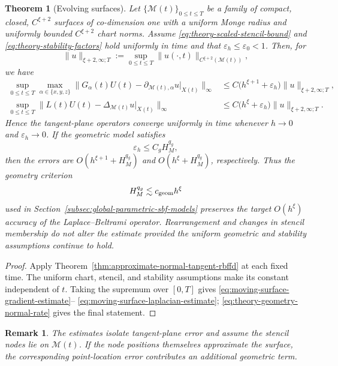 \documentclass[a4paper,fleqn]{cas-sc}
\newtheorem{theorem}{Theorem}
\newtheorem{remark}{Remark}[theorem]
\begin{document}
\begin{theorem}[Evolving surfaces]
\label{thm:moving-surface-tangent-rbffd}
Let \(\{\mathcal M(t)\}_{0\leq t\leq T}\) be a family of compact, closed,
\(C^{\xi+2}\) surfaces of co-dimension one with a uniform Monge radius and uniformly bounded
\(C^{\xi+2}\) chart norms.  Assume
\eqref{eq:theory-scaled-stencil-bound} and
\eqref{eq:theory-stability-factors} hold uniformly in time and that
\(\varepsilon_h\leq\varepsilon_0<1\).  Then, for
\[
  \|u\|_{\xi+2,\infty;T}
  :=\sup_{0\leq t\leq T}
  \|u(\cdot,t)\|_{C^{\xi+2}(\mathcal M(t))},
\]
we have
\begin{align}
  \sup_{0\leq t\leq T}\max_{\alpha\in\{x,y,z\}}
  \|G_\alpha(t)U(t)
  -\partial_{\mathcal M(t),\alpha}u|_{X(t)}\|_\infty
  &\leq C\bigl(h^{\xi+1}+\varepsilon_h\bigr)
  \|u\|_{\xi+2,\infty;T},
  \label{eq:moving-surface-gradient-estimate}\\
  \sup_{0\leq t\leq T}
  \|L(t)U(t)-\Delta_{\mathcal M(t)}u|_{X(t)}\|_\infty
  &\leq C\bigl(h^\xi+\varepsilon_h\bigr)
  \|u\|_{\xi+2,\infty;T}.
  \label{eq:moving-surface-laplacian-estimate}
\end{align}
Hence the tangent-plane operators converge uniformly in time whenever
\(h\to0\) and \(\varepsilon_h\to0\).  If the geometric model satisfies
\begin{equation}
  \varepsilon_h\leq C_g H_M^{q_g},
  \label{eq:theory-geometry-normal-rate}
\end{equation}
then the errors are
\(O(h^{\xi+1}+H_M^{q_g})\) and
\(O(h^\xi+H_M^{q_g})\), respectively.  Thus the geometry criterion
\[
  H_M^{q_g}\lesssim c_{\rm geom}h^\xi
\]
used in Section~\ref{subsec:global-parametric-sbf-models} preserves the target
\(O(h^\xi)\) accuracy of the Laplace--Beltrami operator.  Rearrangement and
changes in stencil membership do not alter the estimate provided the uniform
geometric and stability assumptions continue to hold.
\end{theorem}

\begin{proof}
Apply Theorem~\ref{thm:approximate-normal-tangent-rbffd} at each fixed time.
The uniform chart, stencil, and stability assumptions make its constant
independent of \(t\).  Taking the supremum over \([0,T]\) gives
\eqref{eq:moving-surface-gradient-estimate}--
\eqref{eq:moving-surface-laplacian-estimate};
\eqref{eq:theory-geometry-normal-rate} gives the final statement.
\end{proof}

\begin{remark}
The estimates isolate tangent-plane error and assume the stencil nodes lie on
\(\mathcal M(t)\).  If the node positions themselves approximate the surface,
the corresponding point-location error contributes an additional geometric
term.
\end{remark}
\end{document}
